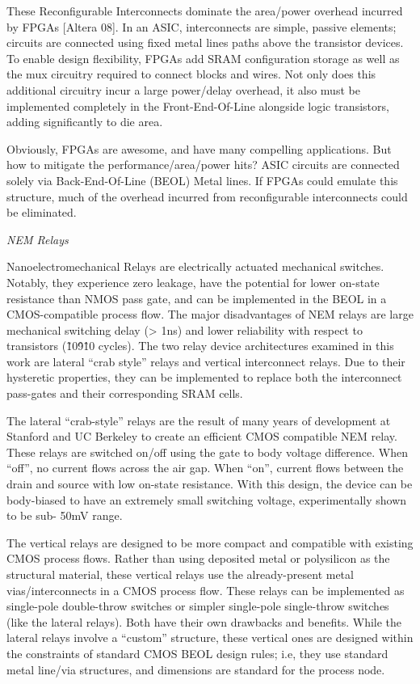 \documentclass[twoside,twocolumn]{article}
\begin{document}
These Reconfigurable Interconnects dominate the area/power overhead incurred by FPGAs [Altera 08]. In an ASIC, interconnects are simple, passive elements; circuits are connected using fixed metal lines paths above the transistor devices. To enable design flexibility, FPGAs add SRAM configuration storage as well as the mux circuitry required to connect blocks and wires. Not only does this additional circuitry incur a large power/delay overhead, it also must be implemented completely in the Front-End-Of-Line alongside logic transistors, adding significantly to die area.

Obviously, FPGAs are awesome, and have many compelling applications. But how to mitigate the performance/area/power hits? ASIC circuits are connected solely via Back-End-Of-Line (BEOL) Metal lines. If FPGAs could emulate this structure, much of the overhead incurred from reconfigurable interconnects could be eliminated.


\textit{NEM Relays}

Nanoelectromechanical Relays are electrically actuated mechanical switches. Notably, they experience zero leakage, have the potential for lower on-state resistance than NMOS pass gate, and can be implemented in the BEOL in a CMOS-compatible process flow. The major disadvantages of NEM relays are large mechanical switching delay (> 1ns) and lower reliability with respect to transistors (\~10\^9\^10 cycles). The two relay device architectures examined in this work are lateral “crab style” relays and vertical interconnect relays. Due to their hysteretic properties, they can be implemented to replace both the interconnect pass-gates and their corresponding SRAM cells.

The lateral “crab-style” relays are the result of many years of development at Stanford and UC Berkeley to create an efficient CMOS compatible NEM relay. These relays are switched on/off using the gate to body voltage difference. When “off”, no current flows across the air gap. When “on”, current flows between the drain and source with low on-state resistance. With this design, the device can be body-biased to have an extremely small switching voltage, experimentally shown to be sub- 50mV range.

The vertical relays are designed to be more compact and compatible with existing CMOS process flows. Rather than using deposited metal or polysilicon as the structural material, these vertical relays use the already-present metal vias/interconnects in a CMOS process flow. These relays can be implemented as single-pole double-throw switches or simpler single-pole single-throw switches (like the lateral relays). Both have their own drawbacks and benefits. While the lateral relays involve a “custom” structure, these vertical ones are designed within the constraints of standard CMOS BEOL design rules; i.e, they use standard metal line/via structures, and dimensions are standard for the process node.
\end{document}
